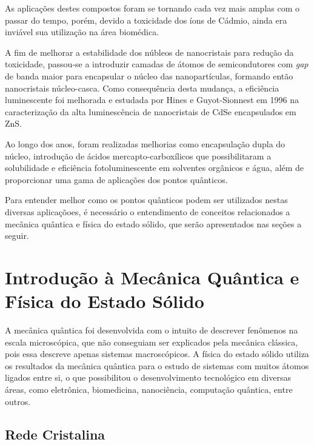 \documentclass[11pt]{article}
\numberwithin{equation}{section}
\begin{document}
\par As aplicações destes compostos foram se tornando cada vez mais amplas com o passar do tempo, porém, devido a toxicidade dos íons de Cádmio, ainda era inviável sua utilização na área biomédica.

\par A fim de melhorar a estabilidade dos núbleos de nanocristais para redução da toxicidade, passou-se a introduzir camadas de átomos de semicondutores com \textit{gap} de banda maior para encapsular o núcleo das nanopartículas, formando então nanocristais núcleo-casca. Como consequência desta mudança, a eficiência luminescente foi melhorada e estudada por Hines e Guyot-Sionnest em 1996 na caracterização da alta luminescência de nanocristais de CdSe encapsulados em ZnS.

\par Ao longo dos anos, foram realizadas melhorias como encapsulação dupla do núcleo, introdução de ácidos mercapto-carboxílicos que possibilitaram a solubilidade e eficiência fotoluminescente em solventes orgânicos e água, além de proporcionar uma gama de aplicações dos pontos quânticos.

\par Para entender melhor como os pontos quânticos podem ser utilizados nestas diversas aplicaçõoes, é necessário o entendimento de conceitos relacionados a mecânica quântica e física do estado sólido, que serão apresentados nas seções a seguir.

\section{Introdução à Mecânica Quântica e Física do Estado Sólido} %

\par A mecânica quântica foi desenvolvida com o intuito de descrever fenômenos na escala microscópica, que não conseguiam ser explicados pela mecânica clássica, pois essa descreve apenas sistemas macroscópicos. A física do estado sólido utiliza os resultados da mecânica quântica para o estudo de sistemas com muitos átomos ligados entre si, o que possibilitou o desenvolvimento tecnológico em diversas áreas, como eletrônica, biomedicina, nanociência, computação quântica, entre outros.\cite{qm_fis1}


  \subsection{Rede Cristalina}
\end{document}

